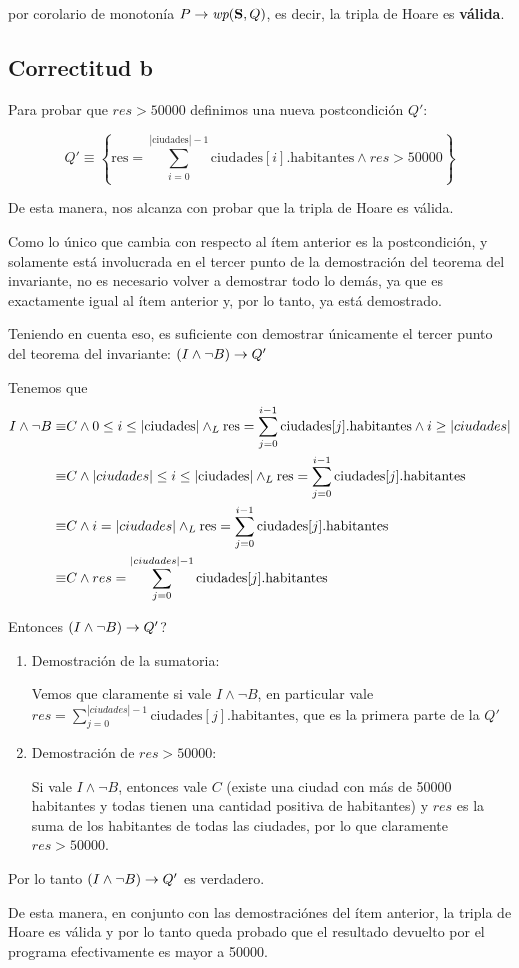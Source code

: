 \documentclass[10pt,a4paper]{article}
\begin{document}
por corolario de monotonía $P \Then \wp{S}{Q}$, es decir, la tripla de Hoare  es \textbf{válida}.

\pagebreak

\subsection{Correctitud b}

Para probar que $res > 50000$ definimos una nueva postcondición $Q'$:

\[Q' \equiv \left\{\text{res} = \sum_{i=0}^{|\text{ciudades}|-1} \text{ciudades}[i].\text{habitantes} \land res > 50000\right\}\]

De esta manera, nos alcanza con probar que la tripla de Hoare  es válida.
\bigskip

Como lo único que cambia con respecto al ítem anterior es la postcondición, y solamente está involucrada en el tercer punto de la demostración del teorema del invariante, no es necesario volver a demostrar todo lo demás, ya que es exactamente igual al ítem anterior y, por lo tanto, ya está demostrado.
\medskip

Teniendo en cuenta eso, es suficiente con demostrar únicamente el tercer punto del teorema del invariante: $(I \land \neg B) \rightarrow Q'$
\medskip

Tenemos que
%
\begin{align*}
	I \land \neg B \equiv & C \land 0 \leq i \leq |\text{ciudades}| \land _L \text{res} = \sum_{j=0}^{i-1} \text{ciudades}[j].\text{habitantes} \land i \geq |ciudades| \\
	\equiv                & C \land |ciudades| \leq i \leq |\text{ciudades}| \land _L \text{res} = \sum_{j=0}^{i-1} \text{ciudades}[j].\text{habitantes}                \\
	\equiv                & C \land i = |ciudades| \land _L \text{res} = \sum_{j=0}^{i-1} \text{ciudades}[j].\text{habitantes}                                          \\
	\equiv                & C \land res = \sum_{j=0}^{|ciudades| - 1} \text{ciudades}[j].\text{habitantes}
\end{align*}

Entonces $(I \land \neg B) \rightarrow Q'$?
%
\begin{enumerate}
	\item Demostración de la sumatoria:

	      Vemos que claramente si vale $I \land \neg B$, en particular vale $res = \sum_{j=0}^{|ciudades| - 1} \text{ciudades}[j].\text{habitantes}$, que es la primera parte de la $Q'$

	\item Demostración de $res > 50000$:

	      Si vale $I \land \neg B$, entonces vale $C$ (existe una ciudad con más de 50000 habitantes y todas tienen una cantidad positiva de habitantes) y $res$ es la suma de los habitantes de todas las ciudades, por lo que claramente $res > 50000$.
\end{enumerate}

Por lo tanto $(I \land \neg B) \rightarrow Q'$ es verdadero.
\bigskip

De esta manera, en conjunto con las demostraciónes del ítem anterior, la tripla de Hoare  es válida y por lo tanto queda probado que el resultado devuelto por el programa efectivamente es mayor a 50000.
\end{document}
